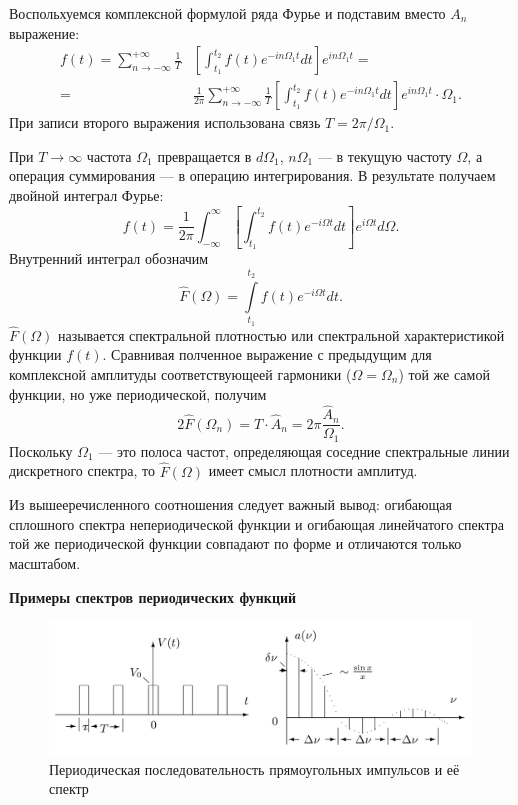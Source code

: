 \documentclass[a4paper, fontsize=14pt]{article}
\begin{document}
Воспольхуемся комплексной формулой ряда Фурье и подставим вместо $A_n$ выражение:
\[
	\begin{aligned} f(t)=\sum_{n \rightarrow-\infty}^{+\infty} \frac{1}{T} & \left[\int_{t_{1}}^{t_{2}} f(t) e^{-i n \Omega_{1} t} d t\right]  e^{i n \Omega_{1} t}=\\=& \frac{1}{2 \pi} \sum_{n \rightarrow-\infty}^{+\infty} \frac{1}{T}\left[\int_{t_{1}}^{t_{2}} f(t) e^{-i n \Omega_{1} t} d t\right] e^{i n \Omega_{1} t} \cdot \Omega_{1}. \end{aligned}
\]
При записи второго выражения использована связь $T = 2 \pi / \Omega_1$.

При $T \rightarrow \infty$ частота $\Omega_1$ превращается в $d \Omega_1$, $n \Omega_1$ --- в текущую частоту $\Omega$, а операция суммирования --- в операцию интегрирования. В результате получаем двойной интеграл Фурье:
\[
f(t)=\frac{1}{2 \pi} \int_{-\infty}^{\infty}\left[\int_{t_{1}}^{t_{2}} f(t) e^{-i \Omega t} d t\right] e^{i \Omega t} d \Omega.
\]
Внутренний интеграл обозначим
\[
\hat F(\Omega) = \int\limits_{t_1}^{t_2} f(t) e^{-i \Omega t} dt.
\]
$\hat F(\Omega)$ называется спектральной плотностью или спектральной характеристикой функции $f(t)$. Сравнивая полченное выражение с предыдущим для комплексной амплитуды соответствующеей гармоники ($\Omega = \Omega_n$) той же самой функции, но уже периодической, получим
\[
	2 \hat F(\Omega_n) = T \cdot \hat A_n = 2 \pi \frac{\hat A_n}{\Omega_1}.
\]
Поскольку $\Omega_1$ --- это полоса частот, определяющая соседние спектральные линии дискретного спектра, то $\hat F(\Omega)$ имеет смысл плотности амплитуд.

Из вышееречисленного соотношения следует важный вывод: огибающая сплошного спектра непериодической функции и огибающая линейчатого спектра той же периодической функции совпадают по форме и отличаются только масштабом.

\textbf{Примеры спектров периодических функций}
\begin{figure}[H]
\center
\includegraphics[scale=0.2]{gr1.png}
\caption{Периодическая последовательность прямоугольных импульсов и её спектр}
\end{figure}
\end{document}

